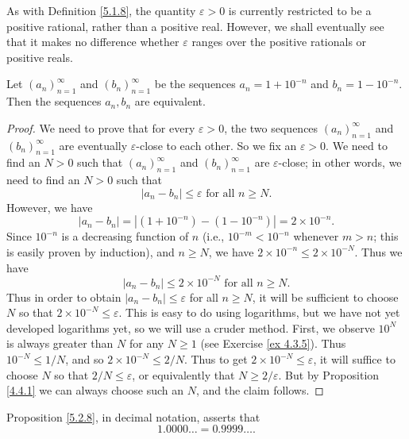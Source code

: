 \begin{remark}\label{5.2.7}
As with Definition \ref{5.1.8}, the quantity \(\varepsilon > 0\) is currently restricted to be a positive rational, rather than a positive real.
However, we shall eventually see that it makes no difference whether \(\varepsilon\) ranges over the positive rationals or positive reals.
\end{remark}

\begin{proposition}\label{5.2.8}
Let \((a_n)_{n = 1}^{\infty}\) and \((b_n)_{n = 1}^{\infty}\) be the sequences \(a_n = 1 + 10^{-n}\) and \(b_n = 1 - 10^{-n}\).
Then the sequences \(a_n, b_n\) are equivalent.
\end{proposition}

\begin{proof}
We need to prove that for every \(\varepsilon > 0\), the two sequences \((a_n)_{n = 1}^{\infty}\) and \((b_n)_{n = 1}^{\infty}\) are eventually \(\varepsilon\)-close to each other.
So we fix an \(\varepsilon > 0\).
We need to find an \(N > 0\) such that \((a_n)_{n = 1}^{\infty}\) and \((b_n)_{n = 1}^{\infty}\) are \(\varepsilon\)-close;
in other words, we need to find an \(N > 0\) such that
\[
    |a_n - b_n| \leq \varepsilon \text{ for all } n \geq N.
\]
However, we have
\[
    |a_n - b_n| = |(1 + 10^{-n}) - (1 - 10^{-n})| = 2 \times 10^{-n}.
\]
Since \(10^{-n}\) is a decreasing function of \(n\) (i.e., \(10^{-m} < 10^{-n}\) whenever \(m > n\);
this is easily proven by induction), and \(n \geq N\), we have \(2 \times 10^{-n} \leq 2 \times 10^{-N}\).
Thus we have
\[
    |a_n - b_n| \leq 2 \times 10^{-N} \text{ for all } n \geq N.
\]
Thus in order to obtain \(|a_n - b_n| \leq \varepsilon\) for all \(n \geq N\), it will be sufficient to choose \(N\) so that \(2 \times 10^{-N} \leq \varepsilon\).
This is easy to do using logarithms, but we have not yet developed logarithms yet, so we will use a cruder method.
First, we observe \(10^N\) is always greater than \(N\) for any \(N \geq 1\) (see Exercise \ref{ex 4.3.5}).
Thus \(10^{-N} \leq 1 / N\), and so \(2 \times 10^{-N} \leq 2 / N\).
Thus to get \(2 \times 10^{-N} \leq \varepsilon\), it will suffice to choose \(N\) so that \(2 / N \leq \varepsilon\), or equivalently that \(N \geq 2 / \varepsilon\).
But by Proposition \ref{4.4.1} we can always choose such an \(N\), and the claim follows.
\end{proof}

\begin{remark}\label{5.2.9}
Proposition \ref{5.2.8}, in decimal notation, asserts that
\[
    1.0000 \dots = 0.9999 \dots.
\]
\end{remark}

